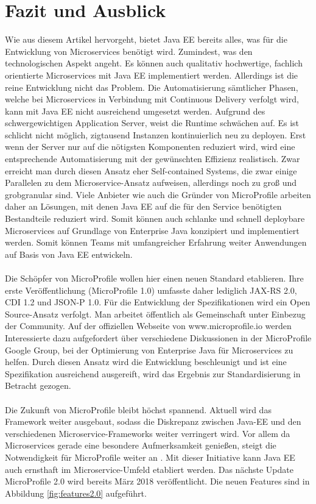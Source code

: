 \section{Fazit und Ausblick}
Wie aus diesem Artikel hervorgeht, bietet Java EE bereits alles, was für die Entwicklung von Microservices benötigt wird. Zumindest, was den technologischen Aspekt angeht. Es können auch qualitativ hochwertige, fachlich orientierte Microservices mit Java EE implementiert werden. Allerdings ist die reine Entwicklung nicht das Problem. Die Automatisierung sämtlicher Phasen, welche bei Microservices in Verbindung mit Continuous Delivery verfolgt wird, kann mit Java EE nicht ausreichend umgesetzt werden. Aufgrund des schwergewichtigen Application Server, weist die Runtime schwächen auf. Es ist schlicht nicht möglich, zigtausend Instanzen kontinuierlich neu zu deployen. Erst wenn der Server nur auf die nötigsten Komponenten reduziert wird, wird eine entsprechende Automatisierung mit der gewünschten Effizienz realistisch. Zwar erreicht man durch diesen Ansatz eher Self-contained Systems, die zwar einige Parallelen zu dem Microservice-Ansatz aufweisen, allerdings noch zu groß und grobgranular sind. Viele Anbieter wie auch die Gründer von MicroProfile arbeiten daher an Lösungen, mit denen Java EE auf die für den Service benötigten Bestandteile reduziert wird. Somit können auch schlanke und schnell deploybare Microservices auf Grundlage von Enterprise Java konzipiert und implementiert werden. Somit können Teams mit umfangreicher Erfahrung weiter Anwendungen auf Basis von Java EE entwickeln. \\ \\
Die Schöpfer von MicroProfile wollen hier einen neuen Standard etablieren. Ihre erste Veröffentlichung (MicroProfile 1.0) umfasste daher lediglich JAX-RS 2.0, CDI 1.2 und JSON-P 1.0. Für die Entwicklung der Spezifikationen wird ein Open Source-Ansatz verfolgt. Man arbeitet öffentlich als Gemeinschaft unter Einbezug der Community. Auf der offiziellen Webseite von www.microprofile.io werden Interessierte dazu aufgefordert über verschiedene Diskussionen in der MicroProfile Google Group, bei der Optimierung von Enterprise Java für Microservices zu helfen. Durch diesen Ansatz wird die Entwicklung beschleunigt und ist eine Spezifikation ausreichend ausgereift, wird das Ergebnis zur Standardisierung in Betracht gezogen. \\ \\
Die Zukunft von MicroProfile bleibt höchst spannend. Aktuell wird das Framework weiter ausgebaut, sodass die Diskrepanz zwischen Java-EE und den verschiedenen Microservice-Frameworks weiter verringert wird. Vor allem da Microservices gerade eine besondere Aufmerksamkeit genießen, steigt die Notwendigkeit für MicroProfile weiter an \cite{LarsRowekamp.2018}. Mit dieser Initiative kann Java EE auch ernsthaft im Microservice-Umfeld etabliert werden. Das nächste Update MicroProfile 2.0 wird bereits März 2018 veröffentlicht. Die neuen Features sind in Abbildung \ref{fig:features2.0} aufgeführt. 

